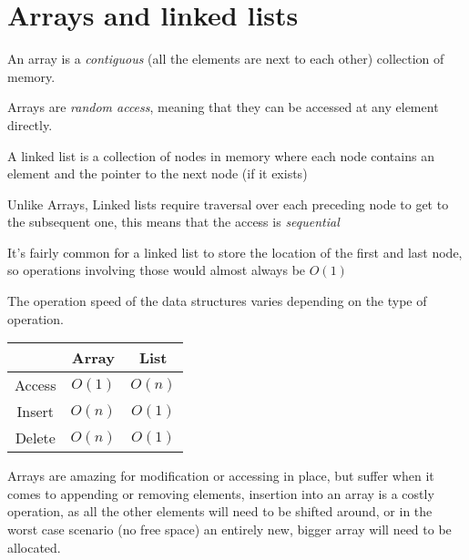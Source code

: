 \documentclass[]{article}
\begin{document}
    \section{Arrays and linked lists}

    \begin{definition}
        An array is a \emph{contiguous} (all the elements are next to each other) collection of memory.
    \end{definition}

    Arrays are \emph{random access}, meaning that they can be accessed at any element directly.

    \begin{definition}
        A linked list is a collection of nodes in memory where each node contains an element and the pointer to the next node (if it exists)
    \end{definition}

    Unlike Arrays, Linked lists require traversal over each preceding node to get to the subsequent one, this means that the access is \emph{sequential}
    \begin{note}
        It's fairly common for a linked list to store the location of the first and last node, so operations involving those would almost always be $O(1)$
    \end{note}

    The operation speed of the data structures varies depending on the type of operation.

    \vspace{.35cm}
    \begin{tabular}{c | c | c}
        & Array & List \\
        \hline
        Access & $O(1)$ & $O(n)$ \\
        Insert & $O(n)$ & $O(1)$\footnotemark[1] \\
        Delete & $O(n)$ & $O(1)$\footnotemark[1]
    \end{tabular}
    \vspace{.35cm}

    
    Arrays are amazing for modification or accessing in place, but suffer when it comes to appending or removing elements, insertion into an array is a costly operation, as all the other elements will need to be shifted around, or in the worst case scenario (no free space) an entirely new, bigger array will need to be allocated.
    
\end{document}
